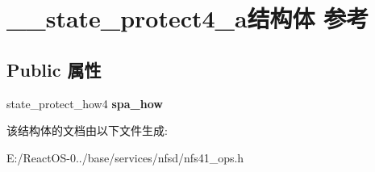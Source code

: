 \hypertarget{struct____state__protect4__a}{}\section{\+\_\+\+\_\+state\+\_\+protect4\+\_\+a结构体 参考}
\label{struct____state__protect4__a}
\subsection*{Public 属性}
\begin{DoxyCompactItemize}
\item 
\mbox{\label{struct____state__protect4__a_a7a48bf99dfe817a15eefda13ab5890eb}} 
state\+\_\+protect\+\_\+how4 {\bfseries spa\+\_\+how}
\end{DoxyCompactItemize}


该结构体的文档由以下文件生成\+:\begin{DoxyCompactItemize}
\item 
E\+:/\+React\+O\+S-\/0../base/services/nfsd/nfs41\+\_\+ops.\+h\end{DoxyCompactItemize}
